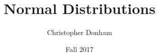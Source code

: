 \documentclass[11pt]{beamer}
\author{Christopher Donham}
\date{Fall 2017}
\institute{Community College of Baltimore County}
\begin{document}
\title[Math 153 - Day 6]{Normal Distributions}

\begin{frame}
\titlepage
\end{frame}

\begin{frame}
\titlepage
\end{frame}

\begin{frame}
\titlepage
\end{frame}
\end{document}
